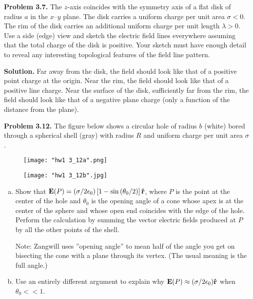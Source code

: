 \documentclass{article}
\begin{document}
\textbf{Problem 3.7.} The $z$-axis coincides with the symmetry axis of a flat disk of radius $a$ in the $x$--$y$ plane. The disk carries a uniform charge per unit area $\sigma < 0$. The rim of the disk carries an additional uniform charge per unit length $\lambda > 0$. Use a side (edge) view and sketch the electric field lines everywhere assuming that the total charge of the disk is positive. Your sketch must have enough detail to reveal any interesting topological features of the field line pattern.

\textbf{Solution.} Far away from the disk, the field should look like that of a positive point charge at the origin. Near the rim, the field should look like that of a positive line charge. Near the surface of the disk, sufficiently far from the rim, the field should look like that of a negative plane charge (only a function of the distance from the plane).



\newpage
\textbf{Problem 3.12.} The figure below shows a circular hole of radius $b$ (white) bored through a spherical shell (gray) with radius $R$ and uniform charge per unit area $\sigma$.

\begin{figure}[H]
\centering
\begin{minipage}{.5\textwidth}
 	\centering
	\texttt{[image: "hw1 3\_12a".png]}
\end{minipage}%
\begin{minipage}{.5\textwidth}
 	\centering
	\texttt{[image: "hw1 3\_12b".jpg]}
\end{minipage}
\end{figure}

\begin{enumerate}[(a)]
\item Show that $\vb{E}(P) = \left(\sigma/2\epsilon _0 \right)\left[1 - \sin \left(\theta _0/2\right)\right]\vu{\vb{r}}$, where $P$ is the point at the center of the hole and $\theta _0$ is the opening angle of a cone whose apex is at the center of the sphere and whose open end coincides with the edge of the hole. Perform the calculation by summing the vector electric fields produced at $P$ by all the other points of the shell.

Note: Zangwill uses ''opening angle'' to mean half of the angle you get on bisecting the cone with a plane through its vertex. (The usual meaning is the full angle.)

\item Use an entirely different argument to explain why $\vb{E}(P) \approx (\sigma/2\epsilon _0)\vu{\vb{r}}$ when $\theta _0 <\!\!< 1$.
\end{enumerate}
\end{document}
